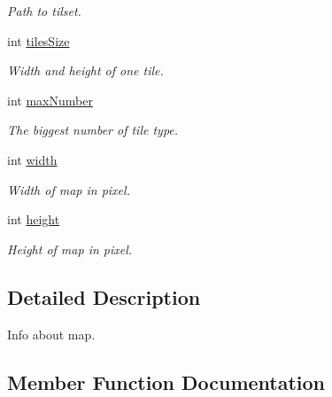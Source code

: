 \begin{DoxyCompactItemize}
\begin{DoxyCompactList}\small\item\em Path to tilset. \end{DoxyCompactList}\item 
\hypertarget{struct_virtual_1_1_map_a9441a7d20d769a4237be8d657e66508b}{}\label{struct_virtual_1_1_map_a9441a7d20d769a4237be8d657e66508b} 
int \hyperlink{struct_virtual_1_1_map_a9441a7d20d769a4237be8d657e66508b}{tiles\+Size}
\begin{DoxyCompactList}\small\item\em Width and height of one tile. \end{DoxyCompactList}\item 
\hypertarget{struct_virtual_1_1_map_a721b68e91377a8e5e29596ad633b61e6}{}\label{struct_virtual_1_1_map_a721b68e91377a8e5e29596ad633b61e6} 
int \hyperlink{struct_virtual_1_1_map_a721b68e91377a8e5e29596ad633b61e6}{max\+Number}
\begin{DoxyCompactList}\small\item\em The biggest number of tile type. \end{DoxyCompactList}\item 
\hypertarget{struct_virtual_1_1_map_ad0b8913dd7e67b7d0d73fe7f2b9c0ab8}{}\label{struct_virtual_1_1_map_ad0b8913dd7e67b7d0d73fe7f2b9c0ab8} 
int \hyperlink{struct_virtual_1_1_map_ad0b8913dd7e67b7d0d73fe7f2b9c0ab8}{width}
\begin{DoxyCompactList}\small\item\em Width of map in pixel. \end{DoxyCompactList}\item 
\hypertarget{struct_virtual_1_1_map_ad0b22c3d2f1be10c717085dac12f8dcb}{}\label{struct_virtual_1_1_map_ad0b22c3d2f1be10c717085dac12f8dcb} 
int \hyperlink{struct_virtual_1_1_map_ad0b22c3d2f1be10c717085dac12f8dcb}{height}
\begin{DoxyCompactList}\small\item\em Height of map in pixel. \end{DoxyCompactList}\end{DoxyCompactItemize}


\subsection{Detailed Description}
Info about map. 

\subsection{Member Function Documentation}
\hypertarget{struct_virtual_1_1_map_ae92e86e0da301c4481718bc871086013}{}\label{struct_virtual_1_1_map_ae92e86e0da301c4481718bc871086013} 
